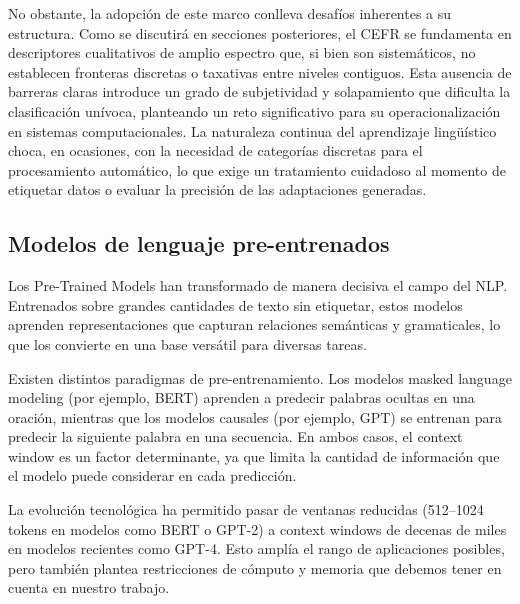 No obstante, la adopción de este marco conlleva desafíos inherentes a su estructura. Como se discutirá en secciones posteriores, el CEFR se fundamenta en descriptores cualitativos de amplio espectro que, si bien son sistemáticos, no establecen fronteras discretas o taxativas entre niveles contiguos. Esta ausencia de barreras claras introduce un grado de subjetividad y solapamiento que dificulta la clasificación unívoca, planteando un reto significativo para su operacionalización en sistemas computacionales. La naturaleza continua del aprendizaje lingüístico choca, en ocasiones, con la necesidad de categorías discretas para el procesamiento automático, lo que exige un tratamiento cuidadoso al momento de etiquetar datos o evaluar la precisión de las adaptaciones generadas.


\subsection{Modelos de lenguaje pre-entrenados} \label{subsec:modelos_pretrain}
Los Pre-Trained Models han transformado de manera decisiva el campo del NLP. Entrenados sobre grandes cantidades de texto sin etiquetar, estos modelos aprenden representaciones que capturan relaciones semánticas y gramaticales, lo que los convierte en una base versátil para diversas tareas.

Existen distintos paradigmas de pre-entrenamiento. Los modelos masked language modeling (por ejemplo, BERT\cite{Devlin2018}) aprenden a predecir palabras ocultas en una oración, mientras que los modelos causales (por ejemplo, GPT\cite{paper_gpt}) se entrenan para predecir la siguiente palabra en una secuencia. En ambos casos, el context window es un factor determinante, ya que limita la cantidad de información que el modelo puede considerar en cada predicción.

La evolución tecnológica ha permitido pasar de ventanas reducidas (512–1024 tokens en modelos como BERT o GPT-2) a context windows de decenas de miles en modelos recientes como GPT-4. Esto amplía el rango de aplicaciones posibles, pero también plantea restricciones de cómputo y memoria que debemos tener en cuenta en nuestro trabajo.



